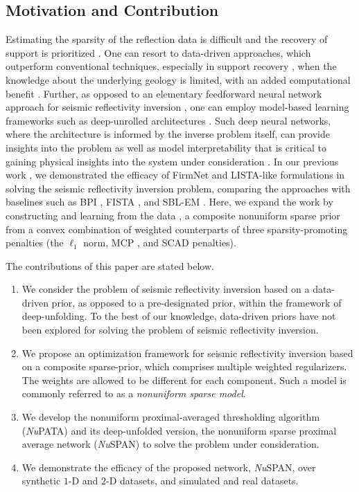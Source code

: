 \documentclass[journal]{IEEEtran}
\begin{document}
\subsection{Motivation and Contribution}
Estimating the sparsity of the reflection data is difficult \cite{li2019optimal, yuan2019seismic} and the recovery of support is prioritized \cite{shearer2009introduction}. One can resort to data-driven approaches, which outperform conventional techniques, especially in support recovery \cite{kim2018geophysical}, when the knowledge about the underlying geology is limited, with an added computational benefit \cite{russell2019machine}. Further, as opposed to an elementary feedforward neural network approach for seismic reflectivity inversion \cite{kim2018geophysical}, one can employ model-based learning frameworks \cite{shlezinger2020modelbased} such as deep-unrolled architectures \cite{monga2021algorithm}. Such deep neural networks, where the architecture is informed by the inverse problem itself, can provide insights into the problem as well as model interpretability that is critical to gaining physical insights into the system under consideration \cite{bergen2019machine}. In our previous work \cite{mache2021durin}, we demonstrated the efficacy of FirmNet \cite{pokala2019firmnet} and LISTA-like \cite{gregor2010learning} formulations in solving the seismic reflectivity inversion problem, comparing the approaches with baselines such as BPI \cite{chen2001atomic, zhang2011seismic}, FISTA \cite{beck2009fast, perez2012inversion}, and SBL-EM \cite{wipf2004sparse, yuan2019seismic}. Here, we expand the work by constructing and learning from the data \cite{bergen2019machine}, a composite nonuniform sparse prior from a convex combination of weighted counterparts of three sparsity-promoting penalties (the $\ell_1$ norm, MCP \cite{zhang2010nearly}, and SCAD \cite{fan2001variable} penalties).

The contributions of this paper are stated below.
\begin{enumerate}
    \item We consider the problem of seismic reflectivity inversion based on a data-driven prior, as opposed to a pre-designated prior, within the framework of deep-unfolding. To the best of our knowledge, data-driven priors have not been explored for solving the problem of seismic reflectivity inversion.
    \item We propose an optimization framework for seismic reflectivity inversion based on a composite sparse-prior, which comprises multiple weighted regularizers. The weights are allowed to be different for each component. Such a model is commonly referred to as a {\it nonuniform sparse model}.
    \item We develop the nonuniform proximal-averaged thresholding algorithm ({\it Nu}PATA) and its deep-unfolded version, the nonuniform sparse proximal average network ({\it Nu}SPAN) to solve the problem under consideration.
    \item We demonstrate the efficacy of the proposed network, {\it Nu}SPAN, over synthetic $1$-D and $2$-D datasets, and simulated and real datasets.
\end{enumerate}
\end{document}
